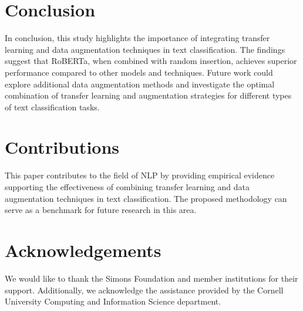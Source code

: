 \documentclass{article}
\begin{document}
\section{Conclusion}
In conclusion, this study highlights the importance of integrating transfer learning and data augmentation techniques in text classification. The findings suggest that RoBERTa, when combined with random insertion, achieves superior performance compared to other models and techniques. Future work could explore additional data augmentation methods and investigate the optimal combination of transfer learning and augmentation strategies for different types of text classification tasks.

\section{Contributions}
This paper contributes to the field of NLP by providing empirical evidence supporting the effectiveness of combining transfer learning and data augmentation techniques in text classification. The proposed methodology can serve as a benchmark for future research in this area.

\section{Acknowledgements}
We would like to thank the Simons Foundation and member institutions for their support. Additionally, we acknowledge the assistance provided by the Cornell University Computing and Information Science department.



\end{document}
